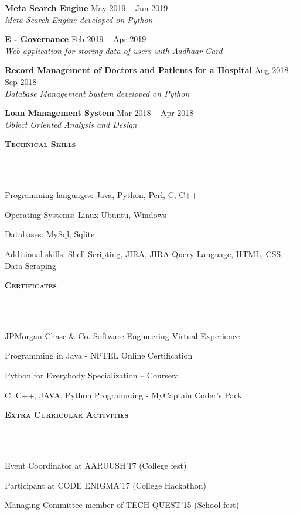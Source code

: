 \documentclass{article}
\newcommand\blfootnote[1]{%
  \begingroup
  \renewcommand\thefootnote{}\footnote{#1}%
  \addtocounter{footnote}{-1}%
  \endgroup
}
\newcommand{\header}[1]{{
\hspace*{-15pt}\vspace*{6pt} \textsc{#1}} \vspace*{-6pt} 
\lineunder
}
\newcommand{\lineunder}{
\vspace*{-8pt} \\ \hspace*{-18pt} 
\hrulefill \\
}
\newcommand{\project}[4]{{
\vspace*{2pt}%
\textbf{#1} #2 \hfill #3\\ \textit{#4} \vspace*{2pt}}
}
\renewcommand{\labelitemii}{
$\vcenter{\hbox{\tiny$\bullet$}}$\hspace*{-3pt}
}
\newenvironment{bullet-list-major}{
\begin{list}{\labelitemii}{\setlength\leftmargin{3pt} 
\topsep 0pt \itemsep -2pt}}{\vspace*{4pt}\end{list}
}
\begin{document}
    \project{Meta Search Engine}{ }{ May 2019 -- Jun 2019}{Meta Search Engine developed on Python}

    \project{E - Governance}{ }{ Feb 2019 -- Apr 2019}{Web application for storing data of users with  Aadhaar Card}
    
    \project{Record Management of Doctors and Patients for a Hospital}{ }{ Aug 2018 -- Sep 2018}{Database Management System developed on Python }
    
    \project{Loan Management System }{ }{ Mar 2018 -- Apr 2018}{Object Oriented Analysis and Design }
	
	
\vspace*{6pt}%
\header{\textbf{Technical Skills}}
    \begin{bullet-list-major}
    \item Programming languages: Java, Python, Perl, C, C++
    \vspace{2pt}
    \item Operating Systems: Linux Ubuntu, Windows
    \vspace{2pt}
    \item Databases: MySql, Sqlite
    \vspace{2pt}
    \item Additional skills: Shell Scripting, JIRA, JIRA Query Language, HTML, CSS, Data Scraping
    \end{bullet-list-major}

\vspace*{6pt}%
\header{\textbf{Certificates}}
    \begin{bullet-list-major}
    \item  JPMorgan Chase \& Co. Software Engineering Virtual Experience 
    \vspace{2pt}
    \item  Programming in Java - NPTEL Online Certification
    \vspace{2pt}
    \item  Python for Everybody Specialization – Coursera 
    \vspace{2pt}
    \item  C, C++, JAVA, Python Programming - MyCaptain Coder's Pack
    \vspace{2pt}
    \end{bullet-list-major}

\vspace*{6pt}%
\header{\textbf{Extra Curricular Activities}}
    \begin{bullet-list-major}
    \item  Event Coordinator at AARUUSH'17 (College fest) 
    \vspace{2pt}
    \item  Participant at CODE ENIGMA'17 (College Hackathon) 
    \vspace{2pt}
    \item  Managing Committee member of TECH QUEST'15 (School fest)
    \end{bullet-list-major}
\end{document}
